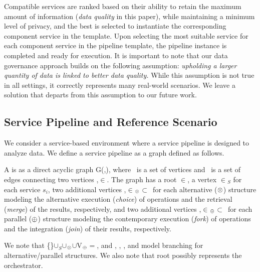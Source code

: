 Compatible services are ranked based on their ability to retain the maximum amount of information (\emph{data quality} in this paper), while maintaining a minimum level of privacy, and the best is selected to instantiate the corresponding component service in the template.
Upon selecting the most suitable service for each component service in the pipeline template, the pipeline instance is completed and ready for execution.
It is important to note that our data governance approach builds on the following assumption: \emph{upholding a larger quantity of data is linked to better data quality.}
While this assumption is not true in all settings, it correctly represents many real-world scenarios. We leave a solution that departs from this assumption to our future work.

\subsection{Service Pipeline and Reference Scenario}\label{sec:service_definition}
We consider a service-based environment where a service pipeline is designed to analyze data.
We define a service pipeline as a graph defined as follows. %
\begin{definition}[\pipeline]\label{def:pipeline}
  A \pipeline is as a direct acyclic graph G(\V,\E), where \V\ is a set of vertices and \E\ is a set of edges connecting two vertices ,$\in$\V.
  The graph has a root $\in$\V, a vertex $\in$\V$_S$ for each service $s_i$, two additional vertices ,$\in$\V$_{\otimes}$$\subset$\V\ for each alternative ($\otimes$) structure modeling the alternative execution (\emph{choice}) of operations and the retrieval (\emph{merge}) of the results, respectively, and two additional vertices ,$\in$\V$_{\oplus}$$\subset$\V\ for each parallel ($\oplus$) structure modeling the contemporary execution (\emph{fork}) of operations and the integration (\emph{join}) of their results, respectively.
\end{definition}

We note that \{\}$\cup$\V$_S$$\cup$\V$_{\otimes}$$\cup$V$_{\oplus}$$=$\V, and , , , and  model branching for alternative/parallel structures.
We also note that root  possibly represents the orchestrator.

